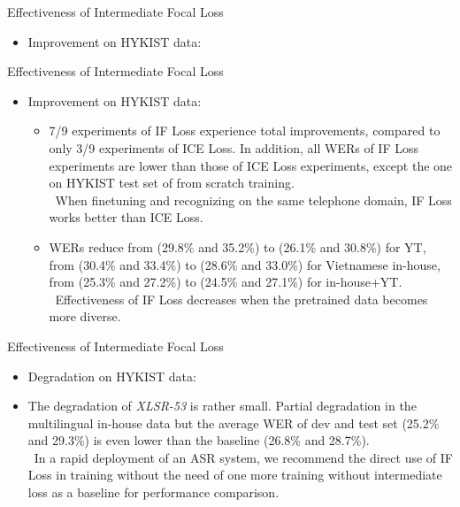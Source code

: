 \begin{frame}{Effectiveness of Intermediate Focal Loss}
\begin{itemize}
    \item Improvement on HYKIST data:
\end{itemize}

\end{frame}


\begin{frame}{Effectiveness of Intermediate Focal Loss}
\begin{itemize}
    \item Improvement on HYKIST data:
    \begin{itemize}
        \item 7/9 experiments of IF Loss experience total improvements, compared to only 3/9 experiments of ICE Loss.
        In addition, all WERs of IF Loss experiments are lower than those of ICE Loss experiments, except the one on HYKIST test set of from scratch training.
        \\ \textrightarrow \,
        When finetuning and recognizing on the same telephone domain, IF Loss works better than ICE Loss.
        
        \item WERs reduce from (29.8\% and 35.2\%) to (26.1\% and 30.8\%) for YT, from (30.4\% and 33.4\%) to (28.6\% and 33.0\%) for Vietnamese in-house, from (25.3\% and 27.2\%) to (24.5\% and 27.1\%) for in-house+YT.
        \\ \textrightarrow \,
        Effectiveness of IF Loss decreases when the pretrained data becomes more diverse.
        
    \end{itemize}
\end{itemize}
\end{frame}


\begin{frame}{Effectiveness of Intermediate Focal Loss}
\begin{itemize}
    \item Degradation on HYKIST data:
\end{itemize}

\begin{itemize}
    \item[] The degradation of \textit{XLSR-53} is rather small.
    Partial degradation in the multilingual in-house data but the average WER of dev and test set (25.2\% and 29.3\%) is even lower than the baseline (26.8\% and 28.7\%).
    \\ \textrightarrow \,
    In a rapid deployment of an ASR system, we recommend the direct use of IF Loss in training without the need of one more training without intermediate loss as a baseline for performance comparison.
\end{itemize}


\end{frame}


